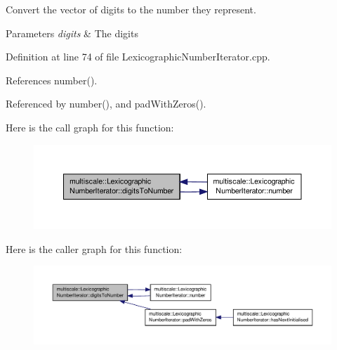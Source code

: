 Convert the vector of digits to the number they represent. 


\begin{DoxyParams}{Parameters}
{\em digits} & The digits \\
\hline
\end{DoxyParams}


Definition at line 74 of file Lexicographic\-Number\-Iterator.\-cpp.



References number().



Referenced by number(), and pad\-With\-Zeros().



Here is the call graph for this function\-:\nopagebreak
\begin{figure}[H]
\begin{center}
\leavevmode
\includegraphics[width=350pt]{classmultiscale_1_1LexicographicNumberIterator_a9bcb610b3b63b02ceed7d556960e57c3_cgraph}
\end{center}
\end{figure}




Here is the caller graph for this function\-:\nopagebreak
\begin{figure}[H]
\begin{center}
\leavevmode
\includegraphics[width=350pt]{classmultiscale_1_1LexicographicNumberIterator_a9bcb610b3b63b02ceed7d556960e57c3_icgraph}
\end{center}
\end{figure}


